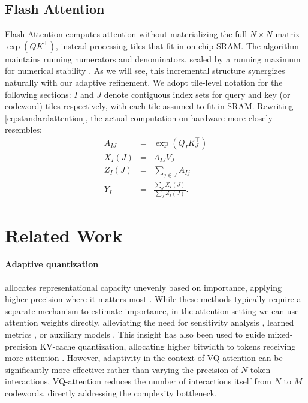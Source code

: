 \subsection{Flash Attention}
\label{sec:flashattention}
Flash Attention \cite{dao2022flashattention,dao2024flashattention2} computes attention without materializing the full $N \times N$ matrix $\exp(QK^{\top})$, instead processing tiles that fit in on-chip SRAM. The algorithm maintains running numerators and denominators, scaled by a running maximum for numerical stability \cite{milakov2018online}. As we will see, this incremental structure synergizes naturally with our adaptive refinement. We adopt tile-level notation for the following sections: $I$ and $J$ denote contiguous index sets for query and key (or codeword) tiles respectively, with each tile assumed to fit in SRAM. Rewriting \cref{eq:standardattention}, the actual computation on hardware more closely resembles:
\begin{eqnarray*}
A_{IJ} &=& \exp(Q_I^{} K_J^{\top}) \\
X_I(J) &=& A_{IJ} V_J \\
Z_I(J) &=& \sum_{j \in J} A_{Ij} \\
Y_I &=& \frac{\sum_J X_I(J)}{\sum_J Z_I(J)}.
\end{eqnarray*}

\section{Related Work}
\label{sec:related_work}

\paragraph{Adaptive quantization}
allocates representational capacity unevenly based on importance, applying higher precision where it matters most \cite{wallace1991jpeg,wang2019haq}. While these methods typically require a separate mechanism to estimate importance, in the attention setting we can use attention weights directly, alleviating the need for sensitivity analysis \cite{wang2019haq}, learned metrics \cite{tang2022mixedprecision}, or auxiliary models \cite{vandendool2025adaptivemesh}. This insight has also been used to guide mixed-precision KV-cache quantization, allocating higher bitwidth to tokens receiving more attention \cite{zhang2023h2o}. However, adaptivity in the context of VQ-attention can be significantly more effective: rather than varying the precision of $N$ token interactions, VQ-attention reduces the number of interactions itself from $N$ to $M$ codewords, directly addressing the complexity bottleneck.
